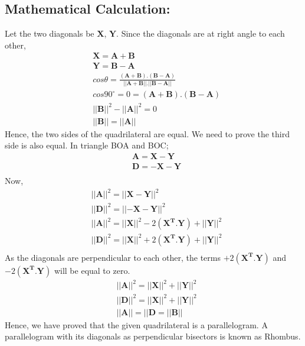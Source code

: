 \documentclass[a4paper,12pt,twocolumn]{article}
\begin{document}
\subsection{Mathematical Calculation:}
Let the two diagonals be $\boldsymbol{X}$, $\boldsymbol{Y}$. Since the diagonals are at right angle to each other,
\begin{align*}
&\boldsymbol{X}= \boldsymbol{A+B}\\
&\boldsymbol{Y}= \boldsymbol{B-A}\\
	&cos\theta = \frac{\boldsymbol{(A+B)}.\boldsymbol{(B-A)}}{||\boldsymbol{A+B}||.||\boldsymbol{B-A}||}\\
&cos90^{\circ} = 0 = (\boldsymbol{A+B}).(\boldsymbol{B-A})\\
&||\boldsymbol{B}||^2 - ||\boldsymbol{A}||^2 = 0\\
&||\boldsymbol{B}|| = ||\boldsymbol{A}||
\end{align*}
Hence, the two sides of the quadrilateral are equal. We need to prove the third side is also equal.
In triangle BOA and BOC;
\begin{align*}
&\boldsymbol{A} = \boldsymbol{X}- \boldsymbol{Y}\\
&\boldsymbol{D} =  \boldsymbol{-X}- \boldsymbol{Y}\\
\end{align*}
Now,
\begin{align*}
&||\boldsymbol{A}||^2 = ||\boldsymbol{X-Y}||^2\\
&||\boldsymbol{D}||^2 = ||\boldsymbol{-X-Y}||^2\\
&||\boldsymbol{A}||^2 = ||\boldsymbol{X}||^2 -2(\boldsymbol{X^T.Y}) +||\boldsymbol{Y}||^2\\
&||\boldsymbol{D}||^2 = ||\boldsymbol{X}||^2 +2(\boldsymbol{X^T.Y}) +||\boldsymbol{Y}||^2\\
\end{align*}
As the diagonals are perpendicular to each other, the terms $+2(\boldsymbol{X^T.Y})$ and $-2(\boldsymbol{X^T.Y})$ will be equal to zero. 
\begin{align*}
&||\boldsymbol{A}||^2 = ||\boldsymbol{X}||^2 + ||\boldsymbol{Y}||^2 \\
&||\boldsymbol{D}||^2 = ||\boldsymbol{X}||^2 + ||\boldsymbol{Y}||^2\\
&||\boldsymbol{A}|| = ||\boldsymbol{D} = ||\boldsymbol{B}||
\end{align*}
Hence, we have proved that the given quadrilateral is a parallelogram. A parallelogram with its diagonals as perpendicular bisectors is known as Rhombus.
\end{document}
